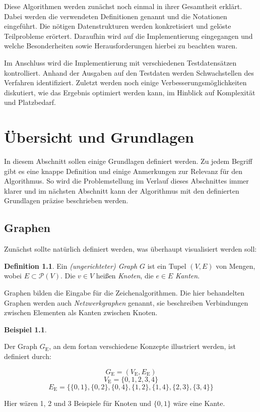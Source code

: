 \documentclass[a4paper]{scrreprt}
\theoremstyle{definition}
\newtheorem{definition}[satz]{Definition}
\newtheorem{example}{Beispiel}[chapter]
\begin{document}
Diese Algorithmen werden zunächst noch einmal in ihrer Gesamtheit erklärt. Dabei werden die
verwendeten Definitionen genannt und die Notationen eingeführt. Die nötigen Datenstrukturen
werden konkretisiert und gelöste Teilprobleme erörtert. Daraufhin wird auf die Implementierung eingegangen und welche Besonderheiten sowie Herausforderungen hierbei zu
beachten waren. 

Im Anschluss wird die Implementierung mit verschiedenen Testdatensätzen kontrolliert. Anhand
der Ausgaben auf den Testdaten werden Schwachstellen des Verfahren identifiziert. 
Zuletzt werden noch einige Verbesserungsmöglichkeiten diskutiert, wie das Ergebnis
optimiert werden kann, im Hinblick auf Komplexität und Platzbedarf.








\chapter{Übersicht und Grundlagen}

In diesem Abschnitt sollen einige Grundlagen definiert werden. Zu jedem Begriff gibt es eine knappe Definition und einige Anmerkungen zur Relevanz für den Algorithmus. So wird die Problemstellung im Verlauf dieses Abschnittes immer klarer und im nächsten Abschnitt kann der Algorithmus mit den definierten Grundlagen präzise beschrieben werden.

\section{Graphen}

Zunächst sollte natürlich definiert werden, was überhaupt visualisiert werden soll:

\begin{definition}
  Ein \emph{(ungerichteter) Graph} $G$ ist ein Tupel $(V, E)$ von Mengen, wobei $E \subset \mathcal{P}(V)$.
  Die $v \in V$ heißen \emph{Knoten}, die $e \in E$ \emph{Kanten}.
\end{definition}

Graphen bilden die Eingabe für die Zeichenalgorithmen. Die hier behandelten Graphen werden auch \emph{Netzwerkgraphen} genannt, sie beschreiben Verbindungen zwischen Elementen als Kanten zwischen Knoten. 

\begin{example}
  \label{ex:graph}

Der Graph $G_\text{E}$, an dem fortan verschiedene Konzepte illustriert werden, ist definiert durch:

\[G_\text{E} = (V_\text{E}, E_\text{E})\]
\[V_\text{E} = \{0, 1, 2, 3, 4\}\]
\[E_\text{E} = \{\{0, 1\}, \{0, 2\}, \{0, 4\}, \{1, 2\}, \{1, 4\}, \{2, 3\}, \{3, 4\}\}\]

Hier wären 1, 2 und 3 Beispiele für Knoten und $\{0, 1\}$ wäre eine Kante.
\end{example}
\end{document}
